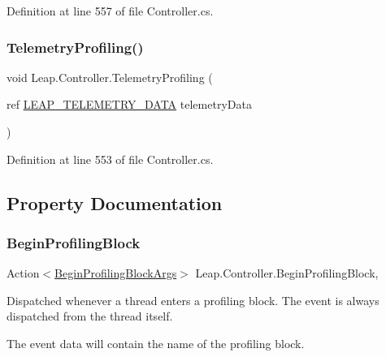 Definition at line 557 of file Controller.\+cs.

\mbox{\label{class_leap_1_1_controller_a0992fb52095c6948ab685dada1abfa2d}} 
\subsubsection{\texorpdfstring{TelemetryProfiling()}{TelemetryProfiling()}}
{\footnotesize\ttfamily void Leap.\+Controller.\+Telemetry\+Profiling (\begin{DoxyParamCaption}\item[{ref \mbox{\hyperlink{struct_leap_internal_1_1_l_e_a_p___t_e_l_e_m_e_t_r_y___d_a_t_a}{L\+E\+A\+P\+\_\+\+T\+E\+L\+E\+M\+E\+T\+R\+Y\+\_\+\+D\+A\+TA}}}]{telemetry\+Data }\end{DoxyParamCaption})}



Definition at line 553 of file Controller.\+cs.



\subsection{Property Documentation}
\mbox{\label{class_leap_1_1_controller_a6195a732f3ce5a94f41bda37fecca548}} 
\subsubsection{\texorpdfstring{BeginProfilingBlock}{BeginProfilingBlock}}
{\footnotesize\ttfamily Action$<$\mbox{\hyperlink{struct_leap_1_1_begin_profiling_block_args}{Begin\+Profiling\+Block\+Args}}$>$ Leap.\+Controller.\+Begin\+Profiling\+Block\hspace{0.3cm}{\ttfamily [add]}, {\ttfamily [remove]}}



Dispatched whenever a thread enters a profiling block. The event is always dispatched from the thread itself. 

The event data will contain the name of the profiling block.

